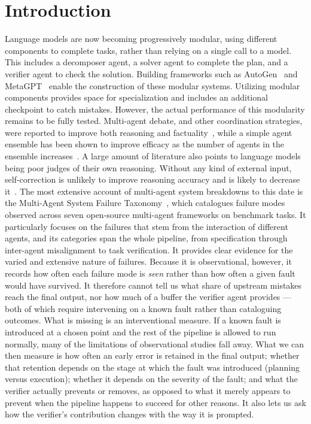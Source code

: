 \documentclass[11pt]{article}
\begin{document}
\section{Introduction}

Language models are now becoming progressively modular, using different components to 
complete tasks, rather than relying on a single call to a model. This includes a decomposer 
agent, a solver agent to complete the plan, and a verifier agent to check the solution. 
Building frameworks such as AutoGen~\citep{wu2023autogen} and MetaGPT~\citep{hong2023metagpt} 
enable the construction of these modular systems. Utilizing modular components provides space 
for specialization and includes an additional checkpoint to catch mistakes. However, the 
actual performance of this modularity remains to be fully tested. Multi-agent debate, and 
other coordination strategies, were reported to improve both reasoning and factuality~\citep{du2023debate}, 
while a simple agent ensemble has been shown to improve efficacy as the number of agents in the 
ensemble increases~\citep{li2024moreagents}. 
\newline A large amount of literature also points to language models being poor judges of 
their own reasoning. Without any kind of external input, self-correction is unlikely to 
improve reasoning accuracy and is likely to decrease it~\citep{huang2023selfcorrect}. The 
most extensive account of multi-agent system breakdowns to this date is the Multi-Agent 
System Failure Taxonomy~\citep{cemri2025mast}, which catalogues failure modes observed across
seven open-source multi-agent frameworks on benchmark tasks. It particularly focuses on the
failures that stem from the interaction of different agents, and its categories span the whole
pipeline, from specification through inter-agent misalignment to task verification. It provides
clear evidence for the varied and extensive nature of failures. Because it is observational,
however, it records how often each failure mode is \emph{seen} rather than how often a given
fault would have survived. It therefore cannot tell us what share of upstream mistakes reach
the final output, nor how much of a buffer the verifier agent provides --- both of which
require intervening on a known fault rather than cataloguing outcomes.
What is missing is an interventional measure. If a known fault is introduced at a chosen point
and the rest of the pipeline is allowed to run normally, many of the limitations of
observational studies fall away. What we can then measure is how often an early error is
retained in the final output; whether that retention depends on the stage at which the fault
was introduced (planning versus execution); whether it depends on the severity of the fault;
and what the verifier actually prevents or removes, as opposed to what it merely appears to
prevent when the pipeline happens to succeed for other reasons. It also lets us ask how the
verifier's contribution changes with the way it is prompted.
\end{document}
